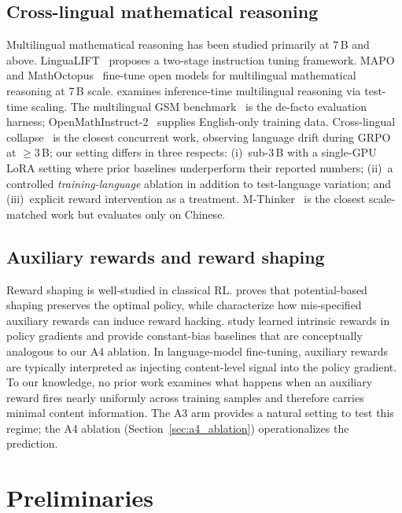\documentclass[11pt]{article}
\newcommand{\armC}{\textsc{A3}}
\newcommand{\armD}{\textsc{A4}}
\begin{document}
\subsection{Cross-lingual mathematical reasoning}
Multilingual mathematical reasoning has been studied primarily at
$7$\,B and above. LinguaLIFT~\cite{lingualift_2024} proposes a two-stage
instruction tuning framework. MAPO~\cite{mapo_2024} and
MathOctopus~\cite{mathoctopus_2024} fine-tune open models for
multilingual mathematical reasoning at 7\,B scale.
\citet{xreasoning_test_time_2025} examines inference-time multilingual
reasoning via test-time scaling. The multilingual GSM
benchmark~\cite{mgsm_2022} is the de-facto evaluation harness;
OpenMathInstruct-2~\cite{openmathinstruct2_2024} supplies English-only
training data. Cross-lingual collapse~\cite{xlingual_collapse_2025} is
the closest concurrent work, observing language drift during GRPO at
$\geq 3$\,B; our setting differs in three respects: (i)~sub-3\,B with a
single-GPU LoRA setting where prior baselines underperform their reported
numbers; (ii)~a controlled \emph{training-language} ablation in addition
to test-language variation; and (iii)~explicit reward intervention as a
treatment. M-Thinker~\cite{mthinker_2025} is the closest scale-matched
work but evaluates only on Chinese.

\subsection{Auxiliary rewards and reward shaping}
Reward shaping is well-studied in classical RL.
\citet{ng1999policy} proves that potential-based shaping preserves the
optimal policy, while \citet{skalse2022rewardhacking} characterize how
mis-specified auxiliary rewards can induce reward hacking.
\citet{zheng_intrinsic_2018} study learned intrinsic rewards in policy
gradients and provide constant-bias baselines that are conceptually
analogous to our \armD{} ablation. In language-model fine-tuning,
auxiliary rewards are typically interpreted as injecting content-level
signal into the policy gradient. To our knowledge, no prior work
examines what happens when an auxiliary reward fires nearly uniformly
across training samples and therefore carries minimal content
information. The \armC{} arm provides a natural setting to test this
regime; the \armD{} ablation (Section~\ref{sec:a4_ablation})
operationalizes the prediction.

\section{Preliminaries}
\label{sec:preliminaries}
\end{document}
